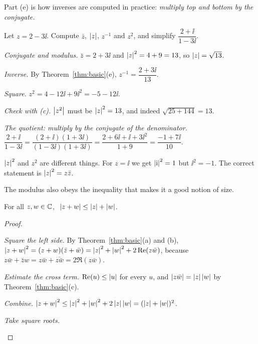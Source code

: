 Part (e) is how inverses are computed in practice: \emph{multiply top and bottom by the conjugate.}

\begin{example}\label{ex:inverse}
  Let $z=2-3\ii$. Compute $\bar z$, $\left|z\right|$, $z^{-1}$ and $z^2$, and simplify $\dfrac{2+\ii}{1-3\ii}$.
\end{example}
\begin{solution}
  \begin{steps}
    \item \emph{Conjugate and modulus.} $\bar z=2+3\ii$ and $\left|z\right|^2=4+9=13$, so $\left|z\right|=\sqrt{13}$.
    \item \emph{Inverse.} By Theorem~\ref{thm:basic}(e), $z^{-1}=\dfrac{2+3\ii}{13}$.
    \item \emph{Square.} $z^2=4-12\ii+9\ii^2=-5-12\ii$.
    \item \emph{Check with (c).} $\left|z^2\right|$ must be $\left|z\right|^2=13$, and indeed $\sqrt{25+144}=13$.
    \item \emph{The quotient: multiply by the conjugate of the denominator.} $\dfrac{2+\ii}{1-3\ii}=\dfrac{(2+\ii)(1+3\ii)}{(1-3\ii)(1+3\ii)}=\dfrac{2+6\ii+\ii+3\ii^2}{1+9}=\dfrac{-1+7\ii}{10}$.
  \end{steps}
\end{solution}

\begin{pitfall}
  $\left|z\right|^2$ and $z^2$ are different things. For $z=\ii$ we get $\left|\mathrm{i}\right|^2=1$ but $\ii^2=-1$. The correct statement is $\left|z\right|^2=z\bar z$.
\end{pitfall}

The modulus also obeys the inequality that makes it a good notion of size.

\begin{theorem}\label{thm:triangle}
  For all $z,w\in\mathbb{C}$, $\ \abs{z+w}\le\abs{z}+\abs{w}$.
\end{theorem}
\begin{proof}
  \begin{steps}
    \item \emph{Square the left side.} By Theorem~\ref{thm:basic}(a) and (b), $\left|z+w\right|^2=(z+w)(\bar z+\bar w)=\left|z\right|^2+\left|w\right|^2+2\operatorname{Re}(z\bar w)$, because $z\bar w+\bar z w=z\bar w+\overline{z\bar w}=2\Re(z\bar w)$.
    \item \emph{Estimate the cross term.} $\operatorname{Re}(u)\le\left|u\right|$ for every $u$, and $\left|z\bar w\right|=\left|z\right|\left|w\right|$ by Theorem~\ref{thm:basic}(c).
    \item \emph{Combine.} $\left|z+w\right|^2\le\left|z\right|^2+\left|w\right|^2+2\left|z\right|\left|w\right|=(\left|z\right|+\left|w\right|)^2$.
    \item \emph{Take square roots.} \qedhere
  \end{steps}
\end{proof}

